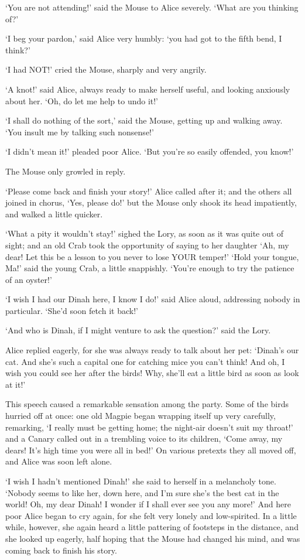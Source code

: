 \documentclass[12pt]{book}
\begin{document}
  `You are not attending!' said the Mouse to Alice severely.
`What are you thinking of?'

  `I beg your pardon,' said Alice very humbly:  `you had got to
the fifth bend, I think?'

  `I had NOT!' cried the Mouse, sharply and very angrily.

  `A knot!' said Alice, always ready to make herself useful, and
looking anxiously about her.  `Oh, do let me help to undo it!'

  `I shall do nothing of the sort,' said the Mouse, getting up
and walking away.  `You insult me by talking such nonsense!'

  `I didn't mean it!' pleaded poor Alice.  `But you're so easily
offended, you know!'

  The Mouse only growled in reply.

  `Please come back and finish your story!' Alice called after
it; and the others all joined in chorus, `Yes, please do!' but
the Mouse only shook its head impatiently, and walked a little
quicker.

  `What a pity it wouldn't stay!' sighed the Lory, as soon as it
was quite out of sight; and an old Crab took the opportunity of
saying to her daughter `Ah, my dear!  Let this be a lesson to you
never to lose YOUR temper!'  `Hold your tongue, Ma!' said the
young Crab, a little snappishly.  `You're enough to try the
patience of an oyster!'

  `I wish I had our Dinah here, I know I do!' said Alice aloud,
addressing nobody in particular.  `She'd soon fetch it back!'

  `And who is Dinah, if I might venture to ask the question?'
said the Lory.

  Alice replied eagerly, for she was always ready to talk about
her pet:  `Dinah's our cat.  And she's such a capital one for
catching mice you can't think!  And oh, I wish you could see her
after the birds!  Why, she'll eat a little bird as soon as look
at it!'

  This speech caused a remarkable sensation among the party.
Some of the birds hurried off at once:  one old Magpie began
wrapping itself up very carefully, remarking, `I really must be
getting home; the night-air doesn't suit my throat!' and a Canary
called out in a trembling voice to its children, `Come away, my
dears!  It's high time you were all in bed!'  On various pretexts
they all moved off, and Alice was soon left alone.

  `I wish I hadn't mentioned Dinah!' she said to herself in a
melancholy tone.  `Nobody seems to like her, down here, and I'm
sure she's the best cat in the world!  Oh, my dear Dinah!  I
wonder if I shall ever see you any more!'  And here poor Alice
began to cry again, for she felt very lonely and low-spirited.
In a little while, however, she again heard a little pattering of
footsteps in the distance, and she looked up eagerly, half hoping
that the Mouse had changed his mind, and was coming back to
finish his story.
\end{document}
